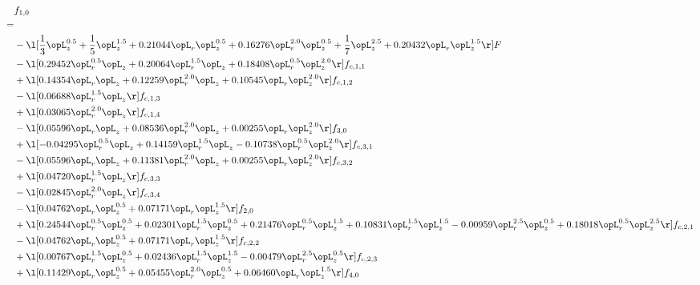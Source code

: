 \begin{alignat}{2} 
\label{eq:f_10_2} 
& f_{1,0} \nonumber \\ 
 = \\ 
& - \l[ \frac{1}{3} \opL_z^{0.5} + \frac{1}{5} \opL_z^{1.5} +  0.21044 \opL_r \opL_z^{0.5} +  0.16276 \opL_r^{2.0} \opL_z^{0.5} + \frac{1}{7} \opL_z^{2.5} +  0.20432 \opL_r \opL_z^{1.5}  \r] F \nonumber \\ 
& - \l[  0.29452 \opL_r^{0.5} \opL_z +  0.20064 \opL_r^{1.5} \opL_z +  0.18408 \opL_r^{0.5} \opL_z^{2.0}  \r] f_{c,1,1} \nonumber \\ 
& + \l[  0.14354 \opL_r \opL_z +  0.12259 \opL_r^{2.0} \opL_z +  0.10545 \opL_r \opL_z^{2.0}  \r] f_{c,1,2} \nonumber \\ 
& - \l[  0.06688 \opL_r^{1.5} \opL_z  \r] f_{c,1,3} \nonumber \\ 
& + \l[  0.03065 \opL_r^{2.0} \opL_z  \r] f_{c,1,4} \nonumber \\ 
& - \l[  0.05596 \opL_r \opL_z +  0.08536 \opL_r^{2.0} \opL_z +  0.00255 \opL_r \opL_z^{2.0}  \r] f_{3,0} \nonumber \\ 
& + \l[  -0.04295 \opL_r^{0.5} \opL_z +  0.14159 \opL_r^{1.5} \opL_z   -0.10738 \opL_r^{0.5} \opL_z^{2.0}  \r] f_{c,3,1} \nonumber \\ 
& - \l[  0.05596 \opL_r \opL_z +  0.11381 \opL_r^{2.0} \opL_z +  0.00255 \opL_r \opL_z^{2.0}  \r] f_{c,3,2} \nonumber \\ 
& + \l[  0.04720 \opL_r^{1.5} \opL_z  \r] f_{c,3,3} \nonumber \\ 
& - \l[  0.02845 \opL_r^{2.0} \opL_z  \r] f_{c,3,4} \nonumber \\ 
& - \l[  0.04762 \opL_r \opL_z^{0.5} +  0.07171 \opL_r \opL_z^{1.5}  \r] f_{2,0} \nonumber \\ 
& + \l[  0.24544 \opL_r^{0.5} \opL_z^{0.5} +  0.02301 \opL_r^{1.5} \opL_z^{0.5} +  0.21476 \opL_r^{0.5} \opL_z^{1.5} +  0.10831 \opL_r^{1.5} \opL_z^{1.5}   -0.00959 \opL_r^{2.5} \opL_z^{0.5} +  0.18018 \opL_r^{0.5} \opL_z^{2.5}  \r] f_{c,2,1} \nonumber \\ 
& - \l[  0.04762 \opL_r \opL_z^{0.5} +  0.07171 \opL_r \opL_z^{1.5}  \r] f_{c,2,2} \nonumber \\ 
& + \l[  0.00767 \opL_r^{1.5} \opL_z^{0.5} +  0.02436 \opL_r^{1.5} \opL_z^{1.5}   -0.00479 \opL_r^{2.5} \opL_z^{0.5}  \r] f_{c,2,3} \nonumber \\ 
& + \l[  0.11429 \opL_r \opL_z^{0.5} +  0.05455 \opL_r^{2.0} \opL_z^{0.5} +  0.06460 \opL_r \opL_z^{1.5}  \r] f_{4,0} \nonumber \\ 

\end{alignat}
